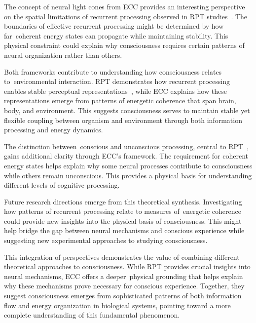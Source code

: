 The concept of neural light cones from ECC provides an interesting perspective on the spatial limitations of recurrent processing observed in RPT studies~\cite{Super2001, Lamme2020}. The boundaries of effective recurrent processing might be determined by how far~coherent energy states can propagate while maintaining stability. This physical constraint could explain why consciousness requires certain patterns of neural organization rather than others.

Both frameworks contribute to understanding how consciousness relates to~environmental interaction. RPT demonstrates how recurrent processing enables stable perceptual representations~\cite{Lamme2006, Lamme2000}, while ECC explains how these representations emerge from patterns of energetic coherence that span brain, body, and environment. This suggests consciousness serves to maintain stable yet flexible coupling between organism and environment through both information processing and energy dynamics.

The distinction between~conscious and unconscious processing, central to RPT~\cite{Dehaene2006, Dehaene2021}, gains additional clarity through ECC's framework. The requirement for coherent energy states helps explain why some neural processes contribute to consciousness while others remain unconscious. This provides a physical basis for understanding different levels of cognitive processing.

Future research directions emerge from this theoretical synthesis. Investigating how patterns of recurrent processing relate to measures of~energetic coherence could provide new insights into the physical basis of consciousness. This might help bridge the gap between neural mechanisms and conscious experience while suggesting new experimental approaches to studying consciousness.

This integration of perspectives demonstrates the value of combining different theoretical approaches to consciousness. While RPT provides crucial insights into neural mechanisms, ECC offers a deeper~physical grounding that helps explain why these mechanisms prove necessary for conscious experience. Together, they suggest consciousness emerges from sophisticated patterns of both information flow and energy organization in biological systems, pointing toward a more complete understanding of this fundamental phenomenon.

